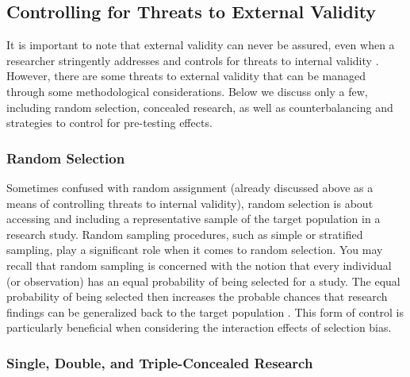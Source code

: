 \documentclass[
  11pt,
]{book}
\begin{document}
\subsection{Controlling for Threats to External Validity}\label{controlling-for-threats-to-external-validity}

It is important to note that external validity can never be assured, even when a researcher stringently addresses and controls for threats to internal validity \citep{ferguson_external_2004}. However, there are some threats to external validity that can be managed through some methodological considerations. Below we discuss only a few, including random selection, concealed research, as well as counterbalancing and strategies to control for pre-testing effects.

\subsubsection{Random Selection}\label{random-selection}

Sometimes confused with random assignment (already discussed above as a means of controlling threats to internal validity), random selection is about accessing and including a representative sample of the target population in a research study. Random sampling procedures, such as simple or stratified sampling, play a significant role when it comes to random selection. You may recall that random sampling is concerned with the notion that every individual (or observation) has an equal probability of being selected for a study. The equal probability of being selected then increases the probable chances that research findings can be generalized back to the target population \citep{ferguson_external_2004}. This form of control is particularly beneficial when considering the interaction effects of selection bias.

\subsubsection{Single, Double, and Triple-Concealed Research}\label{single-double-and-triple-concealed-research}
\end{document}
